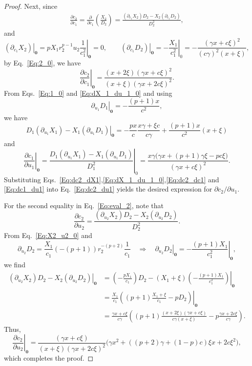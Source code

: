 \documentclass[10pt,a4paper]{amsart}
\begin{document}
\begin{proof}
	Next, since
	\begin{align*}
		\frac{\partial c_2}{\partial c_1} = \frac{\partial}{\partial c_1} \left(\frac{X_2}{D_2}\right) = \frac{(\partial_{c_1}X_2) D_2 - X_2 (\partial_{c_1}D_2)}{D_2^2} ,
	\end{align*}
	and
	$$ \left. (\partial_{c_1}X_2) \right|_{\mathbf{0}} = \left. pX_1 r_2^{p-1} u_2 \frac{1}{c_1^{2}} \right|_{\mathbf{0}} = 0, \qquad  \left. (\partial_{c_1}D_2) \right|_{\mathbf{0}} = \left. - \frac{X_1}{c_1^2} \right|_{0} = - \frac{(\gamma x + c \xi)^2}{(c\gamma)^2 (x + \xi)},
	$$
	by Eq.~\eqref{Eq:2_0},
	we have
	\begin{equation}
	\left.\frac{\partial c_2}{\partial c_1}\right|_{\mathbf{0}}
	= \frac{(x+2\xi)(\gamma x + c\xi)^2}{(x+\xi)(\gamma x + 2c\xi)^2 }. \label{Eq:dc2_dc1}
	\end{equation}
	From Eqs.~\eqref{Eq:1_0} and \eqref{Eq:dX_1_du_1_0} and using
	$$\left. \partial_{u_1} D_1 \right|_{\mathbf{0}} = - \frac{(p+1)x}{c^2},$$
	we have
	$$
	\left. D_1 (\partial_{u_1} X_1) - X_1 (\partial_{u_1} D_1) \right|_{\mathbf{0}}
	=  -\frac{px}{c} \frac{x \gamma + \xi c}{c \gamma} + \frac{(p+1)x}{c^2}(x + \xi )
	$$
	and
	\begin{equation}
	\left.\frac{\partial c_1}{\partial u_1}\right|_{\mathbf{0}}
	=\left. \frac{D_1 (\partial_{u_1} X_1) - X_1 (\partial_{u_1} D_1) }{D_1^2} \right|_{0}=  \frac{x\gamma\big(\gamma x + (p+1)\gamma\xi - p c\xi\big)}{(\gamma x + c \xi)^2}. \label{Eq:dc1_du1}
	\end{equation}
	Substituting Eqs.~\eqref{Eq:dc2_dX1},\eqref{Eq:dX_1_du_1_0},\eqref{Eq:dc2_dc1} and \eqref{Eq:dc1_du1} into Eq.~\eqref{Eq:dc2_du1} yields the desired expression for $\partial c_2 / \partial u_1$.

	For the second equality in Eq.~\eqref{Eq:eval_2}, note that
	$$
	\frac{\partial c_2}{\partial u_2}
	=\frac{(\partial_{u_2}X_2) D_2 - X_2 (\partial_{u_2}D_2)}{D_2^2}.
	$$
	From Eq.~\eqref{Eq:X2_u2_0} and
	$$
	\partial_{u_2} D_2 = \frac{X_1}{c_1} (-(p+1)) r_2^{-(p+2)}\frac{1}{c_1}
	\quad\Rightarrow\quad
	\left.\partial_{u_2}D_2\right|_{\mathbf{0}} = \left. -\frac{(p+1) X_1}{c_1^2} \right|_{\mathbf{0}},
	$$
	we find
	\begin{align*}
	 \left. (\partial_{u_2}X_2)D_2 - X_2(\partial_{u_2}D_2) \right|_{\mathbf{0}}
	&= \left. \left(-\frac{p X_1}{c_1}\right)D_2 - (X_1+\xi)\left(-\frac{(p+1) X_1}{c_1^2}\right) \right|_{\mathbf{0}} \\
	&= \left. \frac{X_1}{c_1}\left( (p+1) \frac{X_1 + \xi}{c_1} - p D_2 \right) \right|_{\mathbf{0}} \\
	&=  \frac{\gamma x + c\xi}{c \gamma } 
	\left( (p+1)\frac{(x+2\xi)(\gamma x + c\xi)}{c\gamma(x+\xi)} -p\frac{\gamma x+2c\xi}{c \gamma}\right).
	\end{align*}
	Thus,
	$$
	\left.\frac{\partial c_2}{\partial u_2}\right|_{\mathbf{0}}
	= \frac{(\gamma x + c\xi)}{(x+\xi)(\gamma x + 2c\xi)^2}
	\Big( \gamma x^2 + ((p+2)\gamma + (1-p)c ) \xi x + 2c\xi^2 \Big),
	$$
	which completes the proof.
\end{proof}
\end{document}
